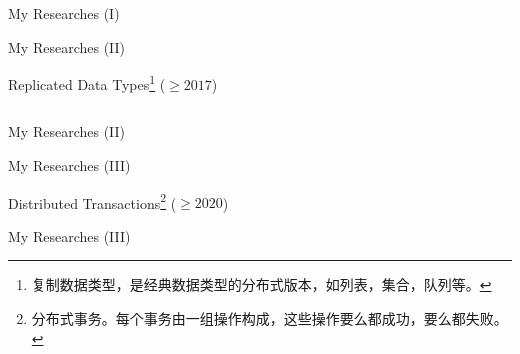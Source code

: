 \begin{frame}{My Researches (I)}

	\vspace{0.30cm}

	\vspace{0.30cm}
\end{frame}

\begin{frame}{My Researches (II)}
	\begin{center}
		Replicated Data Types\footnote{复制数据类型，是经典数据类型的分布式版本，如列表，集合，队列等。} ($\ge 2017$) \\[6pt]

		\begin{columns}[c]
		\end{columns}
	\end{center}
\end{frame}

\begin{frame}{My Researches (II)}

	\vspace{0.30cm}

	\vspace{0.30cm}

	\vspace{0.30cm}
\end{frame}

\begin{frame}{My Researches (III)}
	\begin{center}
		Distributed Transactions\footnote{
			分布式事务。每个事务由一组操作构成，这些操作要么都成功，要么都失败。} ($\ge 2020$)

	\end{center}
\end{frame}

\begin{frame}{My Researches (III)}
\end{frame}
